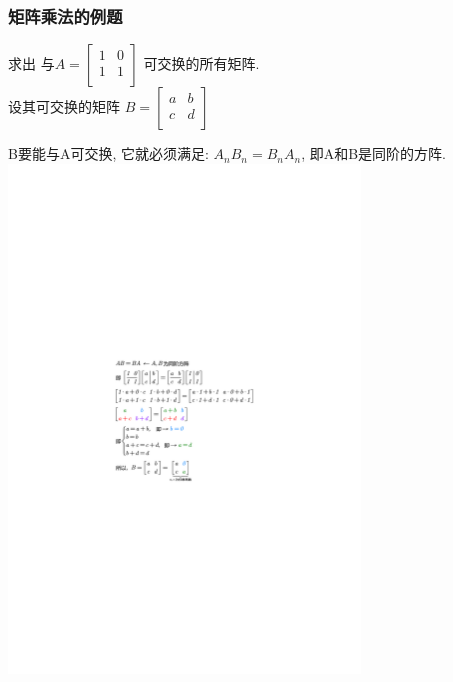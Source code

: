 \documentclass[UTF8]{ctexart}
\begin{document}
\subsubsection{矩阵乘法的例题}

\begin{myEnvSample}
求出 与$
A=\left[ \begin{matrix}
	1&		0\\
	1&		1\\
\end{matrix} \right] 
$ 可交换的所有矩阵.\\

设其可交换的矩阵 $
B=\left[ \begin{matrix}
	a&		b\\
	c&		d\\
\end{matrix} \right] \ 
$

B要能与A可交换, 它就必须满足: $A_n B_n = B_n A_n $, 即A和B是同阶的方阵.  \\

\includegraphics[width=0.7\textwidth]{img/0018.pdf}
\end{myEnvSample}
\end{document}
